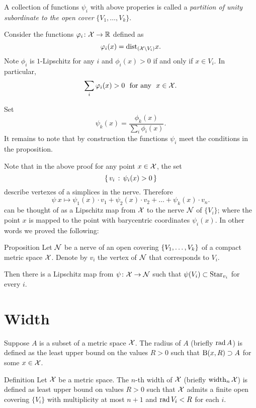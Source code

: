 A collection of functions $\psi_i$ with above properies is called 
a \emph{partition of unity subordinate to the open cover} $\{V_1,\dots,V_k\}$.

Consider the functions $\varphi_i\colon{\mathcal{X}}\to\mathbb{R}$ defined as
$$\varphi_i(x)=\mathrm{dist}_{({\mathcal{X}}\backslash V_i)} x.$$
Note $\phi_i$ is $1$-Lipschitz
for any $i$
and $\phi_i(x)>0$ if and only if $x\in V_i$.
In particular, 
$$\sum_i\phi_i(x)>0\ \ \text{for any}\ \ x\in {\spc{X}}.$$

Set 
$$\psi_k(x)=\frac{\phi_k(x)}{\sum_i\phi_i(x)}.$$
It remains to note that by construction the functions $\psi_i$ meet the conditions in the proposition.
\qedsf


Note that in the above proof for any point $x\in {\mathcal{X}}$,
the set
$$\left\{\,{v_i}\,:\,{\psi_i(x)>0}\,\right\}$$
describe vertexes of a simplices in the nerve.
Therefore 
$$\psi\:x\mapsto \psi_1(x)\cdot v_1+\psi_2(x)\cdot v_2+\dots+\psi_k(x)\cdot v_n.$$
can be thought of as a Lipschitz map from ${\mathcal{X}}$ to the nerve $\mathcal{N}$ of $\{V_i\}$;
where the point $x$ is mapped to the point with barycentric coordinates $\psi_i(x)$.
In other words we proved the following:

\begin{thm}{Proposition}\label{prop:space->nerve}
Let $\mathcal{N}$ be a nerve of an open covering $\{V_1,\z\dots,V_k\}$ of a compact metric space $\mathcal{X}$.
Denote by $v_i$ the vertex of $\mathcal{N}$ that corresponds to $V_i$.

Then there is a Lipschitz map from $\psi\colon\mathcal{X}\to\mathcal{N}$ such that $\psi(V_i)\z\subset\Star_{v_i}$ for every $i$.
\end{thm}


\section{Width}

Suppose $A$ is a subset of a metric space $\mathcal{X}$.
The radius of $A$ (briefly $\mathop{\rm rad}\nolimits A$) is defined as the least upper bound on the values $R>0$ such that $\mathrm{B}{}(x,R)\supset A$ for some $x\in \mathcal{X}$.

\begin{thm}{Definition}\label{def:width}
Let $\mathcal{X}$ be a metric space.
The $n$-th width of $\mathcal{X}$ (briefly $\operatorname{\rm width}\nolimits_n\mathcal{X}$) is defined as least upper bound on values $R>0$ such that $\mathcal{X}$ admits a finite open covering $\{V_i\}$ with multiplicity at most $n+1$ and $\mathop{\rm rad}\nolimits V_i< R$ for each $i$.
\end{thm}

